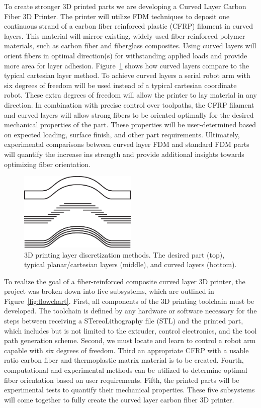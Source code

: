 To create stronger 3D printed parts we are developing a Curved Layer Carbon Fiber 3D Printer. The printer will utilize FDM techniques to deposit one continuous strand of a carbon fiber reinforced plastic (CFRP) filament in curved layers. This material will mirror existing, widely used fiber-reinforced polymer materials, such as carbon fiber and fiberglass composites. Using curved layers will orient fibers in optimal direction(s) for withstanding applied loads and provide more area for layer adhesion. Figure~\ref{fig:layers} shows how curved layers compare to the typical cartesian layer method. To achieve curved layers a serial robot arm with six degrees of freedom will be used instead of a typical cartesian coordinate robot. These extra degrees of freedom will allow the printer to lay material in any direction. In combination with precise control over toolpaths, the CFRP filament and curved layers will allow strong fibers to be oriented optimally for the desired mechanical properties of the part. These properties will be user-determined based on expected loading, surface finish, and other part requirements. Ultimately, experimental comparisons between curved layer FDM and standard FDM parts will quantify the increase ins strength and provide additional insights towards optimizing fiber orientation.\\

\begin{figure}[htp]
\centering
\includegraphics[width=0.5\textwidth]{./figures/layer-methods}
\caption{3D printing layer discretization methods. The desired part (top), typical planar/cartesian layers (middle), and curved layers (bottom).}
\label{fig:layers}
\end{figure}

To realize the goal of a fiber-reinforced composite curved layer 3D printer, the project was broken down into five subsystems, which are outlined in Figure~\ref{fig:flowchart}. First, all components of the 3D printing toolchain must be developed. The toolchain is defined by any hardware or software necessary for the steps between receiving a STereoLithography file (STL) and the printed part, which includes but is not limited to the extruder, control electronics, and the tool path generation scheme. Second, we must locate and learn to control a robot arm capable with six degrees of freedom. Third an appropriate CFRP with a usable ratio carbon fiber and thermoplastic matrix material is to be created. Fourth, computational and experimental methods can be utilized to determine optimal fiber orientation based on user requirements. Fifth, the printed parts will be experimental tests to quantify their mechanical properties. These five subsystems will come together to fully create the curved layer carbon fiber 3D printer.

